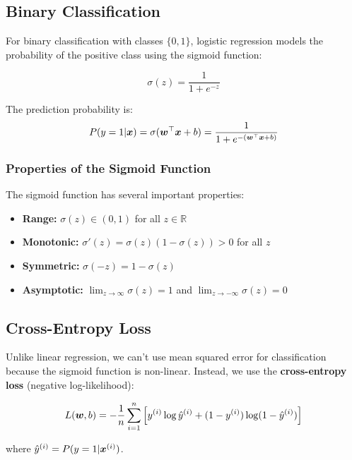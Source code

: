 \subsection{Binary Classification}

For binary classification with classes $\{0, 1\}$, logistic regression models the probability of the positive class using the sigmoid function:

\begin{equation}
\sigma(z) = \frac{1}{1 + e^{-z}}
\end{equation}

The prediction probability is:
\begin{equation}
P(y=1|\boldsymbol{x}) = \sigma(\boldsymbol{w}^\top \boldsymbol{x} + b) = \frac{1}{1 + e^{-(\boldsymbol{w}^\top \boldsymbol{x} + b)}}
\end{equation}

\subsubsection{Properties of the Sigmoid Function}

The sigmoid function has several important properties:
\begin{itemize}
    \item \textbf{Range:} $\sigma(z) \in (0, 1)$ for all $z \in \mathbb{R}$
    \item \textbf{Monotonic:} $\sigma'(z) = \sigma(z)(1-\sigma(z)) > 0$ for all $z$
    \item \textbf{Symmetric:} $\sigma(-z) = 1 - \sigma(z)$
    \item \textbf{Asymptotic:} $\lim_{z \to \infty} \sigma(z) = 1$ and $\lim_{z \to -\infty} \sigma(z) = 0$
\end{itemize}

\subsection{Cross-Entropy Loss}

Unlike linear regression, we can't use mean squared error for classification because the sigmoid function is non-linear. Instead, we use the \textbf{cross-entropy loss} (negative log-likelihood):

\begin{equation}
L(\boldsymbol{w}, b) = -\frac{1}{n} \sum_{i=1}^{n} \left[y^{(i)} \log \hat{y}^{(i)} + (1-y^{(i)}) \log(1-\hat{y}^{(i)})\right]
\end{equation}

where $\hat{y}^{(i)} = P(y=1|\boldsymbol{x}^{(i)})$.

